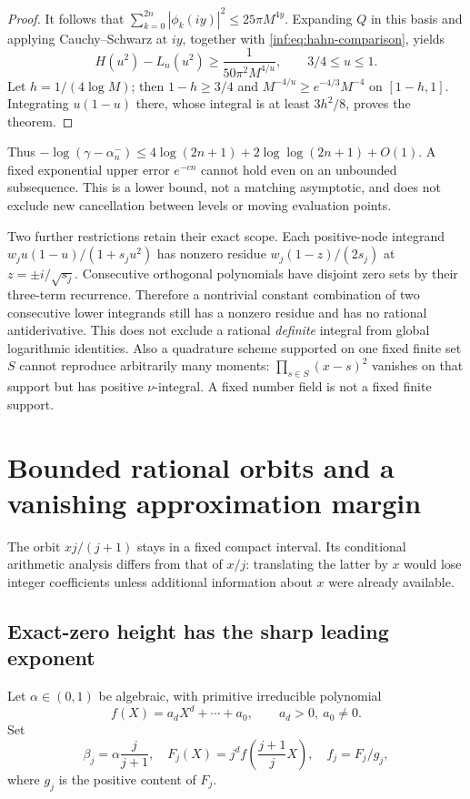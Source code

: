 \documentclass[11pt,a4paper]{article}
\theoremstyle{definition}
\theoremstyle{remark}
\numberwithin{equation}{section}
\begin{document}
\begin{proof}
It follows that $\sum_{k=0}^{2n}|\phi_k(iy)|^2\le25\pi M^{4y}$. Expanding $Q$ in this basis and applying Cauchy--Schwarz at $iy$, together with \eqref{inf:eq:hahn-comparison}, yields
\[
 H(u^2)-L_n(u^2)\ge\frac1{50\pi^2M^{4/u}},\qquad3/4\le u\le1.
\]
Let $h=1/(4\log M)$; then $1-h\ge3/4$ and $M^{-4/u}\ge e^{-4/3}M^{-4}$ on $[1-h,1]$. Integrating $u(1-u)$ there, whose integral is at least $3h^2/8$, proves the theorem.
\end{proof}
Thus $-\log(\gamma-\alpha_n^-)\le4\log(2n+1)+2\log\log(2n+1)+O(1)$. A fixed exponential upper error $e^{-cn}$ cannot hold even on an unbounded subsequence. This is a lower bound, not a matching asymptotic, and does not exclude new cancellation between levels or moving evaluation points.

Two further restrictions retain their exact scope. Each positive-node integrand $w_ju(1-u)/(1+s_ju^2)$ has nonzero residue $w_j(1-z)/(2s_j)$ at $z=\pm i/\sqrt{s_j}$. Consecutive orthogonal polynomials have disjoint zero sets by their three-term recurrence. Therefore a nontrivial constant combination of two consecutive lower integrands still has a nonzero residue and has no rational antiderivative. This does not exclude a rational \emph{definite} integral from global logarithmic identities. Also a quadrature scheme supported on one fixed finite set $S$ cannot reproduce arbitrarily many moments: $\prod_{s\in S}(x-s)^2$ vanishes on that support but has positive $\nu$-integral. A fixed number field is not a fixed finite support.

\section{Bounded rational orbits and a vanishing approximation margin}
\label{inf:sec:orbit}
The orbit $xj/(j+1)$ stays in a fixed compact interval. Its conditional arithmetic analysis differs from that of $x/j$: translating the latter by $x$ would lose integer coefficients unless additional information about $x$ were already available.

\subsection{Exact-zero height has the sharp leading exponent}
\label{inf:sub:orbit-height}
Let $\alpha\in(0,1)$ be algebraic, with primitive irreducible polynomial
\[
 f(X)=a_dX^d+\cdots+a_0,\qquad a_d>0,\ a_0\ne0.
\]
Set
\[
 \beta_j=\alpha\frac j{j+1},\quad
 F_j(X)=j^df\left(\frac{j+1}jX\right),\quad
 f_j=F_j/g_j,
\]
where $g_j$ is the positive content of $F_j$.
\end{document}
